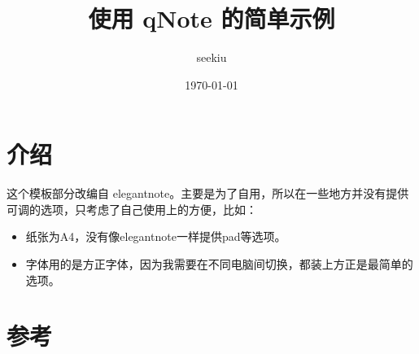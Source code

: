 \documentclass{qnote}
\title{使用 qNote 的简单示例}
\author{seekiu}
\date{\today}
\begin{document}
\maketitle

\section{介绍}
这个模板部分改编自 elegantnote。主要是为了自用，所以在一些地方并没有提供可调的选项，只考虑了自己使用上的方便，比如：

\begin{itemize}
    \item 纸张为A4，没有像elegantnote一样提供pad等选项。
    \item 字体用的是方正字体，因为我需要在不同电脑间切换，都装上方正是最简单的选项。
\end{itemize}

\section{参考}
\end{document}
